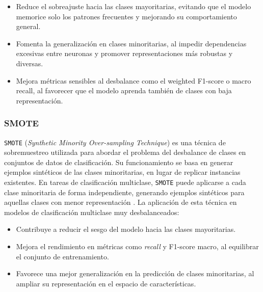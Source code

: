 \begin{itemize}
	\item Reduce el sobreajuste hacia las clases mayoritarias, evitando que el modelo memorice solo los patrones frecuentes y mejorando su comportamiento general.

	\item Fomenta la generalización en clases minoritarias, al impedir dependencias excesivas entre neuronas y promover representaciones más robustas y diversas.

	\item Mejora métricas sensibles al desbalance como el weighted F1-score o macro recall, al favorecer que el modelo aprenda también de clases con baja representación.
\end{itemize}


\subsubsection{SMOTE}
\texttt{SMOTE} (\textit{Synthetic Minority Over-sampling Technique}) es una técnica de sobremuestreo utilizada para abordar el problema del desbalance de clases en conjuntos de datos de clasificación. Su funcionamiento se basa en generar ejemplos sintéticos de las clases minoritarias, en lugar de replicar instancias existentes. En tareas de clasificación multiclase, \texttt{SMOTE} puede aplicarse a cada clase minoritaria de forma independiente, generando ejemplos sintéticos para aquellas clases con menor representación \cite{chawla2002smote}. La aplicación de esta técnica en modelos de clasificación multiclase muy desbalanceados:

\begin{itemize}
	\item Contribuye a reducir el sesgo del modelo hacia las clases mayoritarias.

	\item Mejora el rendimiento en métricas como \textit{recall} y F1-score macro, al equilibrar el conjunto de entrenamiento.

	\item Favorece una mejor generalización en la predicción de clases minoritarias, al ampliar su representación en el espacio de características.
\end{itemize}


